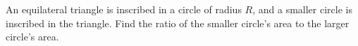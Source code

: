 An equilateral triangle is inscribed in a circle of radius $R$, and a smaller circle is inscribed in the triangle. Find the ratio of the smaller circle's area to the larger circle's area.
